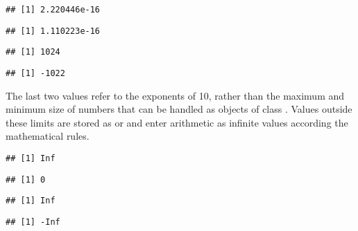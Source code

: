 \documentclass[krantz2]{krantz}\usepackage{knitr}
\begin{document}
\begin{explainbox}
\begin{knitrout}\footnotesize
{}\color{fgcolor}\begin{kframe}
\begin{alltt}
\hlopt{$}
\end{alltt}
\begin{verbatim}
## [1] 2.220446e-16
\end{verbatim}
\begin{alltt}
\hlopt{$}
\end{alltt}
\begin{verbatim}
## [1] 1.110223e-16
\end{verbatim}
\begin{alltt}
\hlopt{$}
\end{alltt}
\begin{verbatim}
## [1] 1024
\end{verbatim}
\begin{alltt}
\hlopt{$}
\end{alltt}
\begin{verbatim}
## [1] -1022
\end{verbatim}
\end{kframe}
\end{knitrout}

The last two values refer to the exponents of 10, rather than the maximum and minimum size of numbers that can be handled as objects of class . Values outside these limits are stored as  or  and enter arithmetic as infinite values according the mathematical rules.

\begin{knitrout}\footnotesize
{}\color{fgcolor}\begin{kframe}
\begin{alltt}
\end{alltt}
\begin{verbatim}
## [1] Inf
\end{verbatim}
\begin{alltt}
\end{alltt}
\begin{verbatim}
## [1] 0
\end{verbatim}
\begin{alltt}
 \hlopt{+} 
\end{alltt}
\begin{verbatim}
## [1] Inf
\end{verbatim}
\begin{alltt}
\hlopt{-} \hlopt{+} 
\end{alltt}
\begin{verbatim}
## [1] -Inf
\end{verbatim}
\end{kframe}
\end{knitrout}


\end{explainbox}
\end{document}
